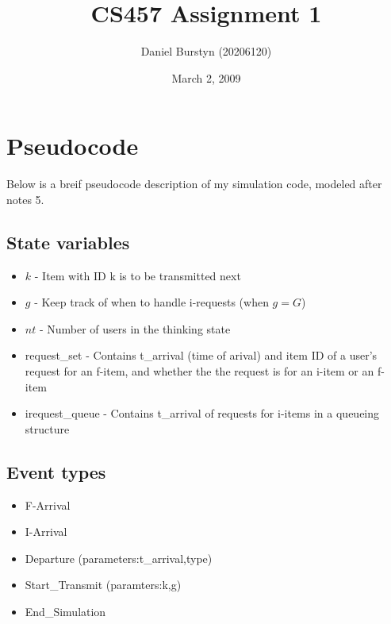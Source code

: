 \documentclass[12pt]{article}
\title{CS457 Assignment 1}
\author{Daniel Burstyn (20206120)}
\date{March 2, 2009}
\begin{document}
\maketitle
\tableofcontents
\doublespace
\newpage

\section{Pseudocode}
Below is a breif pseudocode description of my simulation code, modeled after
notes 5.

\subsection{State variables}
\begin{itemize}
\setlength{\itemsep}{-3mm}
\item $k$ - Item with ID k is to be transmitted next
\item $g$ - Keep track of when to handle i-requests (when $g = G$)
\item $nt$ - Number of users in the thinking state
\item request\_set - Contains t\_arrival (time of arival) and item ID of a
user's request for an f-item, and whether the the request is for an i-item or an
f-item
\item irequest\_queue - Contains t\_arrival of requests for i-items in a
queueing structure
\end{itemize}

\subsection{Event types}
\begin{itemize}
\setlength{\itemsep}{-3mm}
\item F-Arrival
\item I-Arrival
\item Departure (parameters:t\_arrival,type)
\item Start\_Transmit (paramters:k,g)
\item End\_Simulation
\end{itemize}
\end{document}
